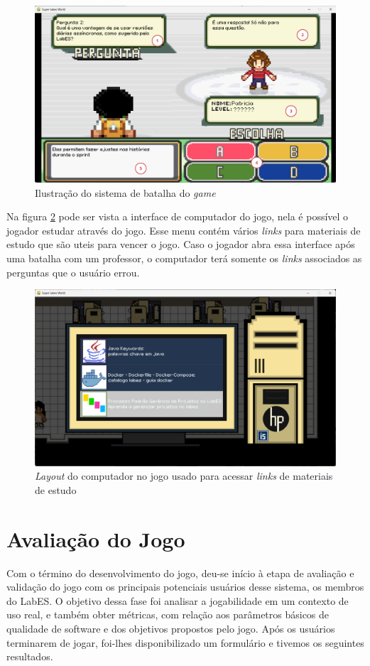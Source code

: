 \begin{figure}[h!]
    \centering
    \includegraphics[width=1\linewidth]{figuras/battle.png}
    \caption{Ilustração do sistema de batalha do \textit{game}}
    \label{fig:battle}
\end{figure}
\newpage
Na figura \ref{fig:computer} pode ser vista a interface de computador do jogo, nela é possível o jogador estudar através do jogo. Esse menu contém vários \textit{links} para materiais de estudo que são uteis para vencer o jogo. Caso o jogador abra essa interface após uma batalha com um professor, o computador terá somente os \textit{links} associados as perguntas que o usuário errou.
\begin{figure}
    \centering
    \includegraphics[width=1\linewidth]{figuras/computer.png}
    \caption{\textit{Layout} do computador no jogo usado para acessar \textit{links} de materiais de estudo}
    \label{fig:computer}
\end{figure}

\section{Avaliação do Jogo}
\label{sec:avaliacao-do-jogo}
Com o término do desenvolvimento do jogo, deu-se início à etapa de avaliação e validação do jogo com os principais potenciais usuários desse sistema, os membros do LabES. O objetivo dessa fase foi analisar a jogabilidade em um contexto de uso real, e também obter métricas, com relação aos parâmetros básicos de qualidade de software e dos objetivos propostos pelo jogo. Após os usuários terminarem de jogar, foi-lhes disponibilizado um formulário e tivemos os seguintes resultados.

